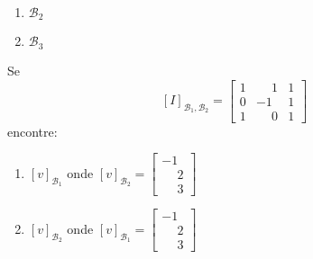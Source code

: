 \documentclass[12pt]{exam}
\begin{document}
\begin{exercicio}
\begin{enumerate}[label={\alph*})]
\begin{enumerate}[label={\roman*})]
            \item $\mathcal{B}_2$

            \item $\mathcal{B}_3$
        \end{enumerate}
    \end{enumerate}
\end{exercicio}

\begin{exercicio}
    Se
    \[
    [I]_{\mathcal{B}_1,\mathcal{B}_2} = \begin{bmatrix}
        1 & \phantom{-}1 & 1\\
        0 & -1 & 1\\
        1 & \phantom{-}0 & 1
    \end{bmatrix}
    \]
    encontre:
    \begin{enumerate}[label={\alph*})]
        \item $[v]_{\mathcal{B}_1}$ onde $[v]_{\mathcal{B}_2} = \begin{bmatrix}
            -1\\\phantom{-}2\\\phantom{-}3
        \end{bmatrix}$

        \item $[v]_{\mathcal{B}_2}$ onde $[v]_{\mathcal{B}_1} = \begin{bmatrix}
            -1\\\phantom{-}2\\\phantom{-}3
        \end{bmatrix}$
    \end{enumerate}
\end{exercicio}
\end{document}
